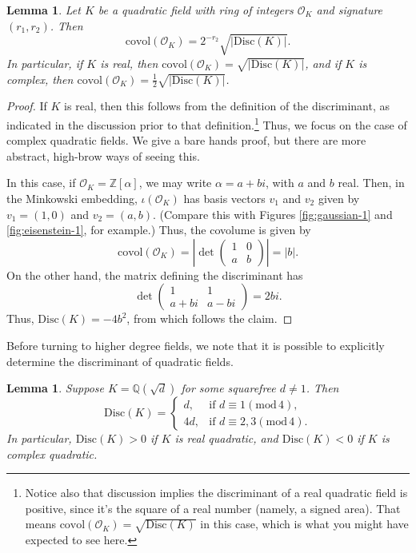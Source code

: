 \documentclass[12pt]{amsart}
\newtheorem{lemma}[theorem]{Lemma}
\theoremstyle{definition} \newtheorem*{notation}{Notation}
\theoremstyle{remark} \newtheorem*{remark}{Remark}
\theoremstyle{remark} \newtheorem*{example}{Example}
\theoremstyle{definition} \newtheorem*{definition}{Definition}
\numberwithin{equation}{section}
\numberwithin{theorem}{section}
\renewcommand{\pmod}[1]{\left(\mathrm{mod}\,#1\right)}
\begin{document}
	\begin{lemma}\label{lem:covolume-quadratic}
		Let $K$ be a quadratic field with ring of integers $\mathcal{O}_K$ and signature $(r_1,r_2)$.  Then
			\[
				\mathrm{covol}(\mathcal{O}_K)
					= 2^{-r_2} \sqrt{|\mathrm{Disc}(K)|}.
			\]
		In particular, if $K$ is real, then $\mathrm{covol}(\mathcal{O}_K) = \sqrt{|\mathrm{Disc}(K)|}$, and if $K$ is complex, then $\mathrm{covol}(\mathcal{O}_K) = \frac{1}{2} \sqrt{|\mathrm{Disc}(K)|}$.
	\end{lemma}
	\begin{proof}
		If $K$ is real, then this follows from the definition of the discriminant, as indicated in the discussion prior to that definition.\footnote{Notice also that discussion implies the discriminant of a real quadratic field is positive, since it's the square of a real number (namely, a signed area).  That means $\mathrm{covol}(\mathcal{O}_K) = \sqrt{\mathrm{Disc}(K)}$ in this case, which is what you might have expected to see here.}  Thus, we focus on the case of complex quadratic fields.  We give a bare hands proof, but there are more abstract, high-brow ways of seeing this.
		
		In this case, if $\mathcal{O}_K = \mathbb{Z}[\alpha]$, we may write $\alpha = a + bi$, with $a$ and $b$ real.  Then, in the Minkowski embedding, $\iota(\mathcal{O}_K)$ has basis vectors $v_1$ and $v_2$ given by $v_1 = (1,0)$ and $v_2 = (a,b)$.  (Compare this with Figures \ref{fig:gaussian-1} and \ref{fig:eisenstein-1}, for example.)  Thus, the covolume is given by
			\[
				\mathrm{covol}(\mathcal{O}_K)
					= \left| \det \begin{pmatrix} 1 & 0 \\ a & b \end{pmatrix} \right| = |b|.
			\]
		On the other hand, the matrix defining the discriminant has
			\[
				\det \begin{pmatrix} 1 & 1 \\ a+bi & a-bi \end{pmatrix} = 2bi.
			\]
		Thus, $\mathrm{Disc}(K) = -4b^2$, from which follows the claim.
	\end{proof}
	
	Before turning to higher degree fields, we note that it is possible to explicitly determine the discriminant of quadratic fields.
	
	\begin{lemma}\label{lem:quadratic-discriminant}
		Suppose $K = \mathbb{Q}(\sqrt{d})$ for some squarefree $d \ne 1$.  Then
			\[
				\mathrm{Disc}(K) =
					\begin{cases}
						d, & \text{if } d \equiv 1 \pmod{4}, \\
						4d, & \text{if } d \equiv 2,3 \pmod{4}.
					\end{cases}
			\]
		In particular, $\mathrm{Disc}(K)>0$ if $K$ is real quadratic, and $\mathrm{Disc}(K)<0$ if $K$ is complex quadratic.
	\end{lemma}
	
\end{document}
